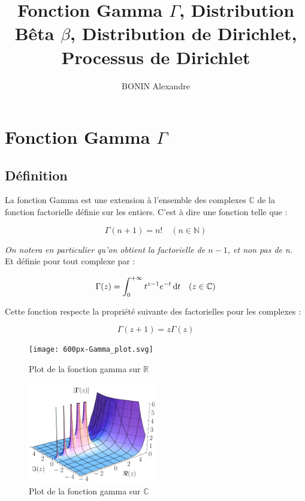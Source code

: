 \documentclass[french]{article}
\title{Fonction Gamma $\Gamma$, Distribution Bêta $\beta$, Distribution de Dirichlet, Processus de Dirichlet}
\author{BONIN Alexandre}
\numberwithin{equation}{section}
\begin{document}
\maketitle

\tableofcontents

\section{Fonction Gamma $\Gamma$}

\subsection{Définition}

La fonction Gamma est une extension à l'ensemble des complexes $\mathbb{C}$ de la fonction factorielle définie sur les entiers. C'est à dire une fonction telle que :

\begin{equation}
\Gamma (n+1) = n! \quad (n \in \mathbb{N})
\end{equation}

\textit{On notera en particulier qu'on obtient la factorielle de $n - 1$, et non pas de n.}
\\

Et définie pour tout complexe par :

\begin{equation}
\Gamma (z) = \int_{0}^{+\infty} t^{z-1} e^{-t} \operatorname{d \!} t \quad (z \in \mathbb{C})
\end{equation}

Cette fonction respecte la propriété suivante des factorielles pour les complexes :

$$\Gamma(z+1) = z \Gamma(z)$$

\begin{figure}[h]
	\centering
	\texttt{[image: 600px-Gamma\_plot.svg]}
	\caption{Plot de la fonction gamma sur $\mathbb{R}$}
\end{figure}

\begin{figure}[h]
	\centering
	\includegraphics[width=0.5\textwidth]{Gamma_abs_3D}
	\caption{Plot de la fonction gamma sur $\mathbb{C}$}
\end{figure}
\end{document}
